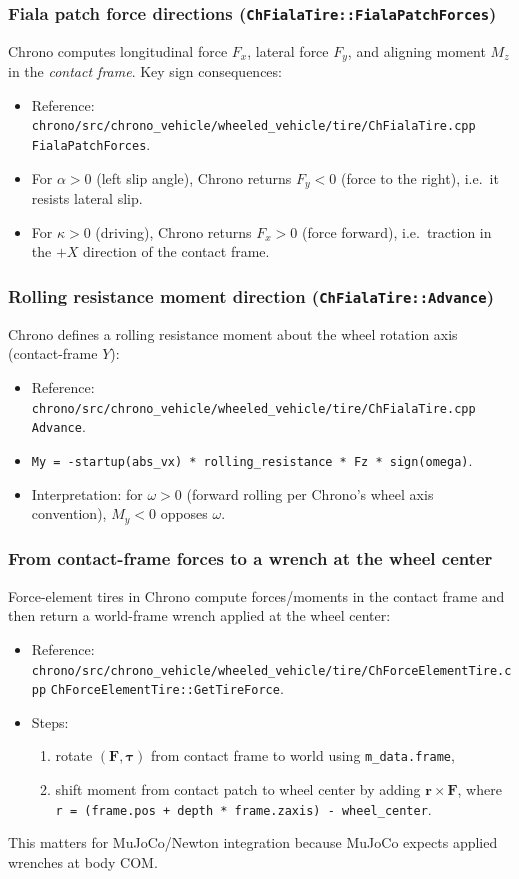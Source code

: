 \subsubsection{Fiala patch force directions (\texttt{ChFialaTire::FialaPatchForces})}
Chrono computes longitudinal force $F_x$, lateral force $F_y$, and aligning moment $M_z$ in the \emph{contact frame}.
Key sign consequences:
\begin{itemize}
  \item Reference: \texttt{chrono/src/chrono\_vehicle/wheeled\_vehicle/tire/ChFialaTire.cpp} \texttt{FialaPatchForces}.
  \item For $\alpha>0$ (left slip angle), Chrono returns $F_y<0$ (force to the right), i.e.\ it resists lateral slip.
  \item For $\kappa>0$ (driving), Chrono returns $F_x>0$ (force forward), i.e.\ traction in the $+X$ direction of the contact frame.
\end{itemize}

\subsubsection{Rolling resistance moment direction (\texttt{ChFialaTire::Advance})}
Chrono defines a rolling resistance moment about the wheel rotation axis (contact-frame $Y$):
\begin{itemize}
  \item Reference: \texttt{chrono/src/chrono\_vehicle/wheeled\_vehicle/tire/ChFialaTire.cpp} \texttt{Advance}.
  \item \texttt{My = -startup(abs\_vx) * rolling\_resistance * Fz * sign(omega)}.
  \item Interpretation: for $\omega>0$ (forward rolling per Chrono's wheel axis convention), $M_y<0$ opposes $\omega$.
\end{itemize}

\subsubsection{From contact-frame forces to a wrench at the wheel center}
Force-element tires in Chrono compute forces/moments in the contact frame and then return a world-frame wrench applied at
the wheel center:
\begin{itemize}
  \item Reference: \texttt{chrono/src/chrono\_vehicle/wheeled\_vehicle/tire/ChForceElementTire.cpp}
        \texttt{ChForceElementTire::GetTireForce}.
  \item Steps:
    \begin{enumerate}
      \item rotate $(\mathbf{F}, \boldsymbol{\tau})$ from contact frame to world using \texttt{m\_data.frame},
      \item shift moment from contact patch to wheel center by adding $\mathbf{r} \times \mathbf{F}$,
            where \texttt{r = (frame.pos + depth * frame.zaxis) - wheel\_center}.
    \end{enumerate}
\end{itemize}
\noindent
This matters for MuJoCo/Newton integration because MuJoCo expects applied wrenches at body COM.

